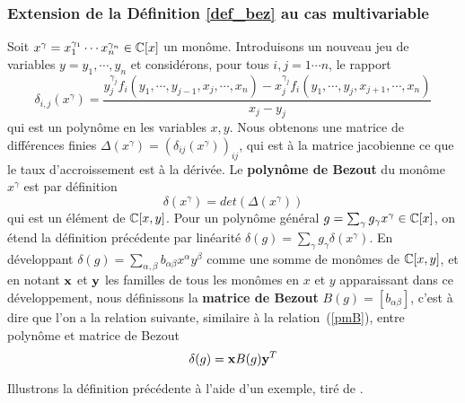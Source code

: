 \documentclass{standalone}
\begin{document}
\subsubsection{Extension de la Définition \ref{def_bez} au cas multivariable}


\begin{defn}
Soit $x^\gamma = x_1^{\gamma_1}\cdots x_n^{\gamma_n} \in \mathbb{C}[x]$ un monôme.
Introduisons un nouveau jeu de variables $y = y_1,\cdots, y_n$ et considérons, pour tous $i, j = 1\cdots n$, le rapport
\begin{equation}
\label{finite_diff}
\delta_{i,j}(x^\gamma) = \dfrac{y_j^{\gamma_j}f_i(y_1,\cdots, y_{j-1},x_j,\cdots,x_n) - x_j^{\gamma_j}f_i(y_1,\cdots,y_j,x_{j+1},\cdots,x_n)}{x_j - y_j}
\end{equation}
qui est un polynôme en les variables $x, y$. Nous obtenons une matrice de différences finies $\Delta(x^\gamma) = (\delta_{ij}(x^\gamma))_{ij}$, qui est à la matrice jacobienne ce que le taux d'accroissement est à la dérivée.
Le {\bf polynôme de Bezout} du monôme $x^\gamma$ est par définition
\begin{equation}
	\delta(x^\gamma) = det(\Delta(x^\gamma))
\end{equation}
qui est un élément de $\mathbb{C}[x, y]$. Pour un polynôme général $g = \sum_\gamma g_\gamma x^\gamma \in \mathbb{C}[x]$, on étend la définition précédente par linéarité $\delta(g) = \sum_\gamma g_\gamma \delta(x^\gamma)$.
En développant $\delta(g) = \sum_{\alpha,\beta} b_{\alpha\beta} x^\alpha y^\beta$ comme une somme de monômes de $\mathbb{C}[x, y]$, et en notant $\bold{x}$ et $\bold{y}$ les familles de tous les monômes en $x$ et $y$ apparaissant dans ce développement, nous définissons la {\bf matrice de Bezout} $B(g) = [b_{\alpha\beta}]$, c'est à dire que l'on a la relation suivante, similaire à la relation~(\ref{pmB}), entre polynôme et matrice de Bezout
\begin{equation}
	\delta(g) = \bold{x} B(g) \bold{y}^T
\end{equation}
\end{defn}
Illustrons la définition précédente à l'aide d'un exemple, tiré de \cite{jpc}.
\end{document}
